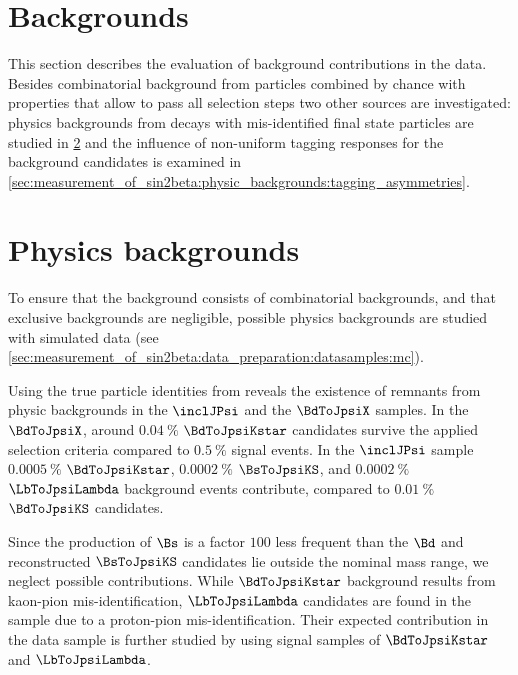 
\section{Backgrounds}
\label{sec:measurement_of_sin2beta:physic_backgrounds}

This section describes the evaluation of background contributions in the data.
Besides combinatorial background from particles combined by chance with
properties that allow to pass all selection steps two other sources are
investigated: physics backgrounds from decays with mis-identified final state
particles are studied in
\cref{sec:measurement_of_sin2beta:physic_backgrounds:physic_backgrounds} and the
influence of non-uniform tagging responses for the background candidates is
examined in
\cref{sec:measurement_of_sin2beta:physic_backgrounds:tagging_asymmetries}.

\section{Physics backgrounds}
\label{sec:measurement_of_sin2beta:physic_backgrounds:physic_backgrounds}

To ensure that the background consists of combinatorial backgrounds, and that
exclusive backgrounds are negligible, possible physics backgrounds are studied
with simulated data (see \cref{sec:measurement_of_sin2beta:data_preparation:datasamples:mc}). 

Using the true particle identities from \MC reveals the existence of remnants
from physic backgrounds in the $\inclJPsi$ and the $\BdToJpsiX$ \MC samples. In
the $\BdToJpsiX$, around $\SI{0.04}{\percent}$ $\BdToJpsiKstar$ candidates
survive the applied selection criteria compared to $\SI{0.5}{\percent}$ signal
events. In the $\inclJPsi$ sample $\SI{0.0005}{\percent}$ $\BdToJpsiKstar$,
$\SI{0.0002}{\percent}$ $\BsToJpsiKS$, and $\SI{0.0002}{\percent}$
$\LbToJpsiLambda$ background events contribute, compared to
$\SI{0.01}{\percent}$ $\BdToJpsiKS$ candidates.

Since the production of $\Bs$ is a factor $\num{100}$ less frequent than the
$\Bd$ and reconstructed $\BsToJpsiKS$ candidates lie outside the nominal mass
range, we neglect possible contributions. While $\BdToJpsiKstar$ background
results from kaon-pion mis-identification, $\LbToJpsiLambda$ candidates are
found in the sample due to a proton-pion mis-identification. Their expected
contribution in the data sample is further studied by using signal \MC samples
of $\BdToJpsiKstar$ and $\LbToJpsiLambda$.

